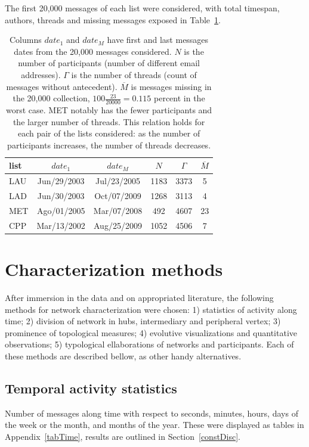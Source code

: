 \documentclass[%
 aip,
 jmp,%
 amsmath,amssymb,
 reprint,%
]{revtex4-1}
\begin{document}
 The first 20,000 messages of each list were considered, with total timespan, authors, threads and missing messages exposed in Table~\ref{geralListas}.

\begin{table}
  \centering
  \begin{tabular}{|l|c|c|c|c|c|}\hline
list & $date_1$ & $date_{M}$    & $N$  & $\Gamma$ & $\overline{M}$ \\\hline
LAU  & Jun/29/2003 & Jul/23/2005 & 1183 & 3373 & 5 \\
LAD  & Jun/30/2003 & Oct/07/2009 & 1268 & 3113 & 4 \\
MET  & Ago/01/2005 & Mar/07/2008 & 492  & 4607 & 23 \\
CPP  & Mar/13/2002 & Aug/25/2009 & 1052 & 4506 & 7 \\ \hline
  \end{tabular}
  \caption{Columns $date_1$ and $date_M$ have first and last messages dates from the 20,000 messages considered.
$N$ is the number of participants (number of different email addresses).
$\Gamma$ is the number of threads (count of messages without antecedent).
$\overline{M}$ is messages missing in the 20,000 collection, $100\frac{23}{20000}=0.115$ percent in the worst case.
MET notably has the fewer participants and the larger number of threads.
This relation holds for each pair of the lists considered: as the number of participants increases,
 the number of threads decreases.}
  \label{geralListas}
\end{table}



\section{Characterization methods}
After immersion in the data and on appropriated literature, the following methods for network characterization were chosen: 1) statistics of activity along time; 2) division of network in hubs, intermediary and peripheral vertex; 3) prominence of topological measures; 4) evolutive visualizations and quantitative observations; 5) typological ellaborations of networks and participants.
Each of these methods are described bellow, as other handy alternatives.

    \subsection{Temporal activity statistics}
Number of messages along time with respect to seconds, minutes, hours, days of the week or the month, and months of the year. These were displayed as tables in Appendix~\ref{tabTime}, results are outlined in Section~\ref{constDisc}.
\end{document}
